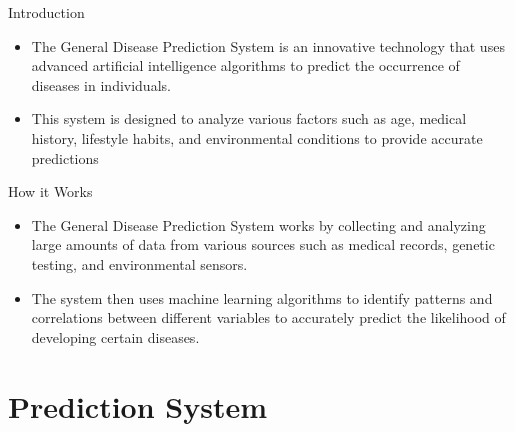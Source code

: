 \documentclass{SKP-beamer}
\begin{document}
\begin{frame}{Introduction}
\begin{itemize}
  \item The General Disease Prediction System is an innovative technology that uses advanced artificial intelligence algorithms to predict the occurrence of diseases in individuals.
  
  \item This system is designed to analyze various factors such as age, medical history, lifestyle habits, and environmental conditions to provide accurate predictions
\end{itemize}
\end{frame}






\begin{frame}{How it Works}
	\begin{itemize}
		\item The General Disease Prediction System works by collecting and analyzing large amounts of data from various sources such as medical records, genetic testing, and environmental sensors.
		\item The system then uses machine learning algorithms to identify patterns and correlations between different variables to accurately predict the likelihood of developing certain diseases.
	\end{itemize}
\end{frame}

\section{Prediction System}
\end{document}
